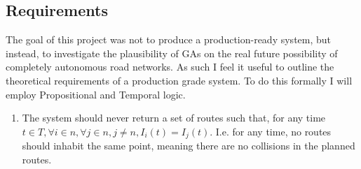 \subsection{Requirements}
\label{subsec:requirements}

The goal of this project was not to produce a production-ready system, but instead, to investigate the plausibility of GAs on the real future possibility of completely autonomous road networks. As such I feel it useful to outline the theoretical requirements of a production grade system. To do this formally I will employ Propositional and Temporal logic.

\begin{enumerate}
\item The system should never return a set of routes such that, for any time $t \in T, \forall i \in n, \forall j \in n, j \neq n, I_{i}(t) = I_{j}(t)$. I.e. for any time, no routes should inhabit the same point, meaning there are no collisions in the planned routes.
\end{enumerate}


